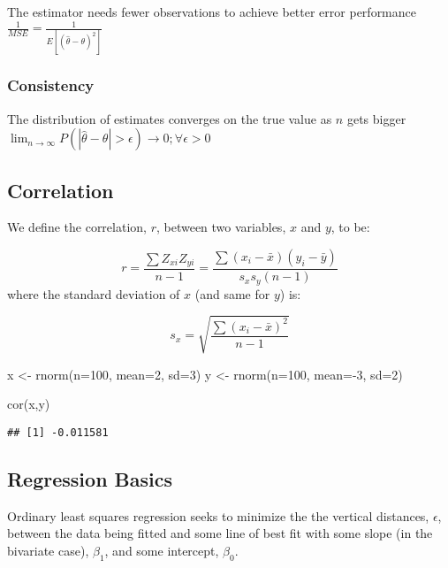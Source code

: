 \documentclass[
]{article}
\newenvironment{Shaded}{\begin{snugshade}}{\end{snugshade}}
\newcommand{\AttributeTok}[1]{\textcolor[rgb]{0.77,0.63,0.00}{#1}}
\newcommand{\DecValTok}[1]{\textcolor[rgb]{0.00,0.00,0.81}{#1}}
\newcommand{\FunctionTok}[1]{\textcolor[rgb]{0.00,0.00,0.00}{#1}}
\newcommand{\NormalTok}[1]{#1}
\newcommand{\OtherTok}[1]{\textcolor[rgb]{0.56,0.35,0.01}{#1}}
\newcommand{\SpecialCharTok}[1]{\textcolor[rgb]{0.00,0.00,0.00}{#1}}
\begin{document}
The estimator needs fewer observations to achieve better error
performance \(\frac{1}{MSE}=\frac{1}{E[(\hat{\theta}-\theta)^2]}\)

\hypertarget{consistency}{%
\subsubsection{Consistency}\label{consistency}}

The distribution of estimates converges on the true value as \(n\) gets
bigger
\(\lim_{n\to\infty} P(|\hat{\theta} - \theta| > \epsilon) \to 0; \forall\epsilon >0\)

\hypertarget{correlation}{%
\subsection{Correlation}\label{correlation}}

We define the correlation, \(r\), between two variables, \(x\) and
\(y\), to be:

\[r=\frac{\sum{Z_{xi}Z_{yi}}}{n-1}=\frac{\sum{(x_i-\bar{x})(y_i-\bar{y})}}{s_xs_y(n-1)}\]
where the standard deviation of \(x\) (and same for \(y\)) is:

\[s_x=\sqrt{\frac{\sum{(x_i-\bar{x})^2}}{n-1}}\]

\begin{Shaded}
\begin{Highlighting}[]
\NormalTok{x }\OtherTok{\textless{}{-}} \FunctionTok{rnorm}\NormalTok{(}\AttributeTok{n=}\DecValTok{100}\NormalTok{, }\AttributeTok{mean=}\DecValTok{2}\NormalTok{, }\AttributeTok{sd=}\DecValTok{3}\NormalTok{)}
\NormalTok{y }\OtherTok{\textless{}{-}} \FunctionTok{rnorm}\NormalTok{(}\AttributeTok{n=}\DecValTok{100}\NormalTok{, }\AttributeTok{mean=}\SpecialCharTok{{-}}\DecValTok{3}\NormalTok{, }\AttributeTok{sd=}\DecValTok{2}\NormalTok{)}

\FunctionTok{cor}\NormalTok{(x,y)}
\end{Highlighting}
\end{Shaded}

\begin{verbatim}
## [1] -0.011581
\end{verbatim}

\hypertarget{regression-basics}{%
\subsection{Regression Basics}\label{regression-basics}}

Ordinary least squares regression seeks to minimize the the vertical
distances, \(\epsilon\), between the data being fitted and some line of
best fit with some slope (in the bivariate case), \(\beta_1\), and some
intercept, \(\beta_0\).
\end{document}
